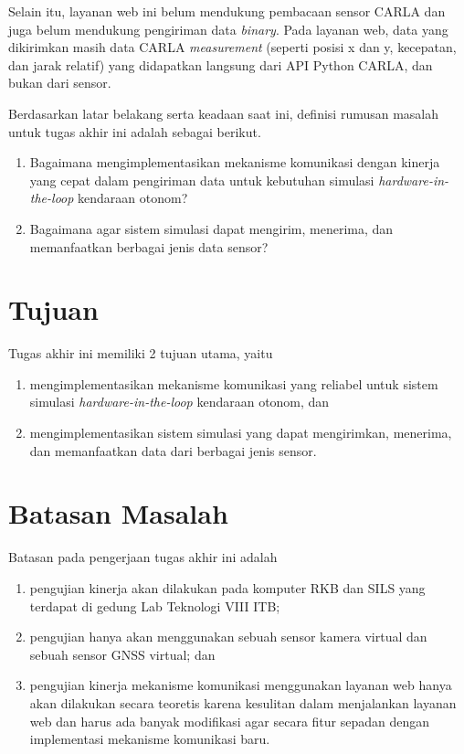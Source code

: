 Selain itu, layanan web ini belum mendukung pembacaan sensor CARLA dan juga
belum mendukung pengiriman data \textit{binary}. Pada layanan web, data yang
dikirimkan masih data CARLA \textit{measurement} (seperti posisi x dan y,
kecepatan, dan jarak relatif) yang didapatkan langsung dari API Python CARLA,
dan bukan dari sensor.

Berdasarkan latar belakang serta keadaan saat ini, definisi rumusan masalah
untuk tugas akhir ini adalah sebagai berikut.
\begin{enumerate}
	\item Bagaimana mengimplementasikan mekanisme komunikasi dengan kinerja
	      yang cepat dalam pengiriman data untuk kebutuhan simulasi
	      \textit{hardware-in-the-loop} kendaraan otonom?
	\item Bagaimana agar sistem simulasi dapat mengirim, menerima, dan
	      memanfaatkan berbagai jenis data sensor?
\end{enumerate}

\section{Tujuan}

Tugas akhir ini memiliki 2 tujuan utama, yaitu
\begin{enumerate}
	\item mengimplementasikan mekanisme komunikasi yang reliabel untuk sistem
	      simulasi \textit{hardware-in-the-loop} kendaraan otonom, dan
	\item mengimplementasikan sistem simulasi yang dapat mengirimkan,
	      menerima, dan memanfaatkan data dari berbagai jenis sensor.
\end{enumerate}

\section{Batasan Masalah}

Batasan pada pengerjaan tugas akhir ini adalah

\begin{enumerate}
	\item pengujian kinerja akan dilakukan pada komputer RKB dan SILS yang
	      terdapat di gedung Lab Teknologi VIII ITB;
	\item pengujian hanya akan menggunakan sebuah sensor kamera virtual dan
	      sebuah sensor GNSS virtual; dan
	\item pengujian kinerja mekanisme komunikasi menggunakan layanan web hanya akan
	      dilakukan secara teoretis karena kesulitan dalam menjalankan layanan web
	      dan harus ada banyak modifikasi agar secara fitur sepadan dengan
	      implementasi mekanisme komunikasi baru.
\end{enumerate}


